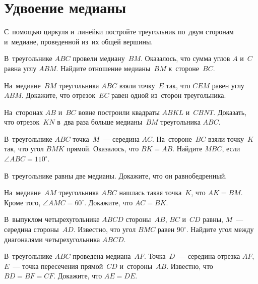 
\section*{Удвоение медианы}


\begin{problems}


\item
С~помощью циркуля и~линейки постройте треугольник по~двум сторонам и~медиане,
проведенной из~их общей вершины.


\item
В~треугольнике $ABC$ провели медиану~$BM$.
Оказалось, что сумма углов $A$ и~$C$ равна углу $ABM$.
Найдите отношение медианы~$BM$ к~стороне~$BC$.

\item
На~медиане~$BM$ треугольника $ABC$ взяли точку~$E$ так, что $CEM$ равен
углу $ABM$.
Докажите, что отрезок~$EC$ равен одной из~сторон треугольника.

\item
На~сторонах $AB$ и~$BC$ вовне построили квадраты $ABKL$ и~$CBNT$.
Доказать, что отрезок~$KN$ в~два раза больше медианы~$BM$ треугольника $ABC$.

\item
В~треугольнике $ABC$ точка~$M$~--- середина $AC$.
На~стороне~$BC$ взяли точку~$K$ так, что угол $BMK$ прямой.
Оказалось, что $BK = AB$.
Найдите $MBC$, если $\angle ABC =110^{\circ}$.

\item
В~треугольнике равны две медианы.
Докажите, что он равнобедренный.

\item
На~медиане~$AM$ треугольника $ABC$ нашлась такая точка~$K$, что $AK = BM$.
Кроме того, $\angle AMC = 60^{\circ}$.
Докажите, что $AC = BK$.

\item
В~выпуклом четырехугольнике $ABCD$ стороны~$AB$, $BC$ и~$CD$ равны,
$M$~--- середина стороны~$AD$.
Известно, что угол $BMC$ равен $90^{\circ}$.
Найдите угол между диагоналями четырехугольника $ABCD$.

\item
В~треугольнике $ABC$ проведена медиана~$AF$.
Точка~$D$~--- середина отрезка $AF$, $E$~--- точка пересечения прямой~$CD$
и~стороны~$AB$.
Известно, что $BD = BF = CF$.
Докажите, что $AE = DE$.

\end{problems}

